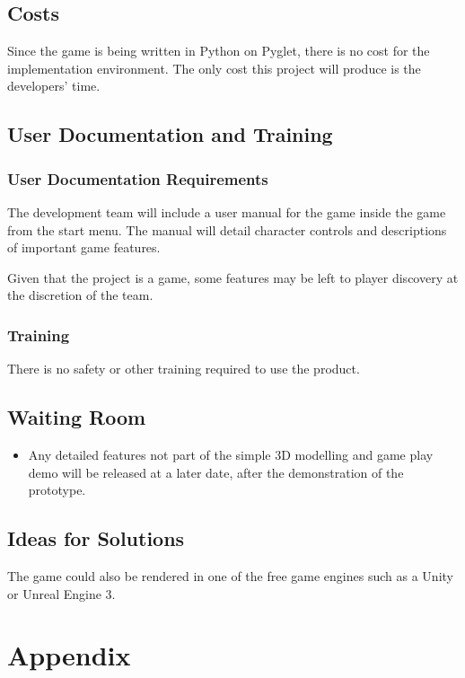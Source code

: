 \documentclass[12pt, titlepage]{article}
\begin{document}
\subsection{Costs}
Since the game is being written in Python on Pyglet, there is no cost for the implementation environment.
The only cost this project will produce is the developers' time.



\subsection{User Documentation and Training}
\subsubsection{User Documentation Requirements}
The development team will include a user manual for the game inside the game from the start menu. The manual will detail character controls and descriptions of important game features.

Given that the project is a game, some features may be left to player discovery at the discretion of the team.

\subsubsection{Training}
There is no safety or other training required to use the product.
\subsection{Waiting Room}
\begin{itemize}
    \item Any detailed features not part of the simple 3D modelling and game play demo will be released at a later date, after the demonstration of the prototype.
\end{itemize}

\subsection{Ideas for Solutions}
The game could also be rendered in one of the free game engines such as a Unity or Unreal Engine 3.





\newpage

\section{Appendix}
\end{document}
